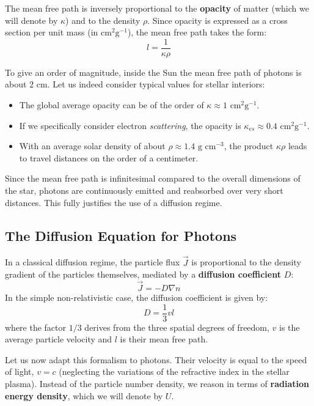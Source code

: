 The mean free path is inversely proportional to the \textbf{opacity} of matter (which we will denote by $\kappa$) and to the density $\rho$. Since opacity is expressed as a cross section per unit mass (in $\text{cm}^2 \text{g}^{-1}$), the mean free path takes the form:
\begin{equation}
l = \frac{1}{\kappa \rho}
\end{equation}

To give an order of magnitude, inside the Sun the mean free path of photons is about $2 \text{ cm}$. Let us indeed consider typical values for stellar interiors:
\begin{itemize}
\item The global average opacity can be of the order of $\kappa \approx 1 \text{ cm}^2 \text{g}^{-1}$.
\item If we specifically consider electron \textit{scattering}, the opacity is $\kappa_{es} \approx 0.4 \text{ cm}^2 \text{g}^{-1}$.
\item With an average solar density of about $\rho \approx 1.4 \text{ g cm}^{-3}$, the product $\kappa \rho$ leads to travel distances on the order of a centimeter.
\end{itemize}
Since the mean free path is infinitesimal compared to the overall dimensions of the star, photons are continuously emitted and reabsorbed over very short distances. This fully justifies the use of a diffusion regime.

\subsection{The Diffusion Equation for Photons}

In a classical diffusion regime, the particle flux $\vec{J}$ is proportional to the density gradient of the particles themselves, mediated by a \textbf{diffusion coefficient} $D$:
\begin{equation}
\vec{J} = - D \nabla n
\end{equation}
In the simple non-relativistic case, the diffusion coefficient is given by:
\begin{equation}
D = \frac{1}{3} v l
\end{equation}
where the factor $1/3$ derives from the three spatial degrees of freedom, $v$ is the average particle velocity and $l$ is their mean free path.

Let us now adapt this formalism to photons. Their velocity is equal to the speed of light, $v = c$ (neglecting the variations of the refractive index in the stellar plasma). Instead of the particle number density, we reason in terms of \textbf{radiation energy density}, which we will denote by $U$.

